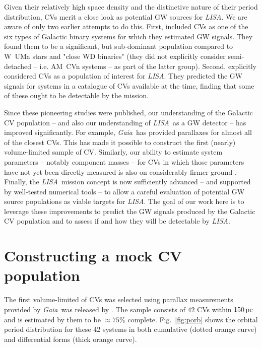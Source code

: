 \documentclass[fleqn,usenatbib]{mnras}
\newcommand{\lisa}{{\it LISA}}
\newcommand{\gaia}{{\it Gaia}}
\begin{document}
Given their relatively high space density and the distinctive nature of their period distribution, CVs merit a close look as potential GW sources for \lisa. We are aware of only two earlier attempts to do this. First, \cite{HBW90} included CVs as one of the six types of Galactic binary systems for which they estimated GW signals. They found them to be a significant, but sub-dominant population compared to W~UMa stars and "close WD binaries" (they did not explicitly consider semi-detached -- i.e. AM~CVn systems -- as part of the latter group). Second, \cite{MAA00} explicitly considered CVs as a population of interest for \lisa. They predicted the GW signals for systems in a catalogue of CVs available at the time, finding that some of these ought to be detectable by the mission. 

Since these pioneering studies were published, our understanding of the Galactic CV population -- and also our understanding of \lisa\ as a GW detector -- has improved significantly. For example, \gaia\ has provided parallaxes for almost all of the closest CVs. This has made it possible to construct the first (nearly) volume-limited sample of CV. Similarly, our ability to estimate system parameters -- notably component masses -- for CVs in which those parameters have not yet been directly measured is also on considerably firmer ground \citep{knigge06,knigge11,savoury11,carter13}. Finally, the \lisa\ mission concept is now sufficiently advanced -- and supported by well-tested numerical tools -- to allow a careful evaluation of potential GW source populations as viable targets for \lisa \citep[e.g.][]{PhysRevD.107.063004,LEGWORK_joss,LEGWORK_apjs}. The goal of our work here is to leverage these improvements to predict the GW signals produced by the Galactic CV population and to assess if and how they will be detectable by \lisa.


\section{Constructing a mock CV population}\label{sec:mock_CV}

The first volume-limited of CVs was selected using parallax measurements provided by \gaia\ was released by \cite{pala20}. The sample consists of $42$ CVs within $150\,\rm{pc}$ and is estimated by them to be $\approx 75\%$ complete. Fig.~\ref{fig:porb} shows the orbital period distribution for these 42 systems in both cumulative (dotted orange curve) and differential forms (thick orange curve).
\end{document}
